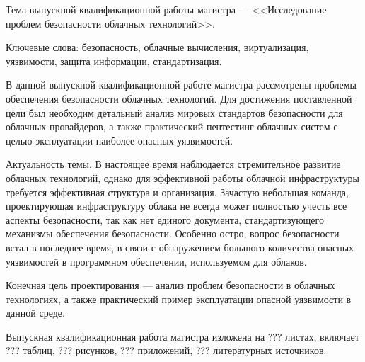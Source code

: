 
Тема выпускной квалификационной работы магистра --- <<Исследование проблем безопасности облачных технологий>>.

Ключевые слова: безопасность, облачные вычисления, виртуализация, уязвимости, защита информации, стандартизация.

В данной выпускной квалификационной работе магистра рассмотрены проблемы обеспечения безопасности облачных технологий.
Для достижения поставленной цели был необходим детальный анализ мировых стандартов безопасности для облачных провайдеров, а также практический пентестинг облачных систем с целью эксплуатации наиболее опасных уязвимостей.

Актуальность темы.
В настоящее время наблюдается стремительное развитие облачных технологий, однако для эффективной работы облачной инфраструктуры требуется эффективная структура и организация.
Зачастую небольшая команда, проектирующая инфраструктуру облака не всегда может полностью учесть все аспекты безопасности, так как нет единого документа, стандартизующего механизмы обеспечения безопасности.
Особенно остро, вопрос безопасности встал в последнее время, в связи с обнаружением большого количества опасных уязвимостей в программном обеспечении, используемом для облаков.

Конечная цель проектирования --- анализ проблем безопасности в облачных технологиях, а также практический пример эксплуатации опасной уязвимости в данной среде.

Выпускная квалификационная работа магистра изложена на ??? листах, включает ??? таблиц, ??? рисунков, ??? приложений, ??? литературных источников.

\clearpage
